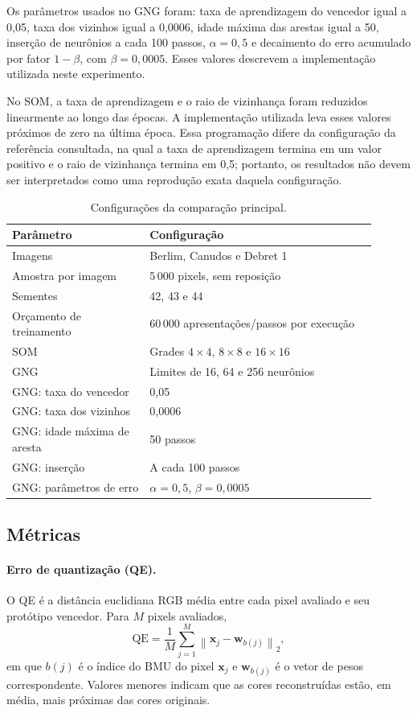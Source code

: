 \documentclass[11pt,a4paper]{article}
\begin{document}
Os parâmetros usados no GNG foram: taxa de aprendizagem do vencedor igual a
0,05, taxa dos vizinhos igual a 0,0006, idade máxima das arestas igual a 50,
inserção de neurônios a cada 100 passos, \(\alpha=0,5\) e decaimento do erro
acumulado por fator \(1-\beta\), com \(\beta=0,0005\). Esses valores descrevem
a implementação utilizada neste experimento.

No SOM, a taxa de aprendizagem e o raio de vizinhança foram reduzidos
linearmente ao longo das épocas. A implementação utilizada leva esses valores
próximos de zero na última época. Essa programação difere da configuração da
referência consultada, na qual a taxa de aprendizagem termina em um valor
positivo e o raio de vizinhança termina em 0,5; portanto, os resultados não
devem ser interpretados como uma reprodução exata daquela configuração.

\begin{table}[H]
\centering
\caption{Configurações da comparação principal.}
\label{tab:params}
\begin{tabular}{p{0.34\linewidth}p{0.56\linewidth}}
\toprule
Parâmetro & Configuração\\
\midrule
Imagens & Berlim, Canudos e Debret 1\\
Amostra por imagem & 5\,000 pixels, sem reposição\\
Sementes & 42, 43 e 44\\
Orçamento de treinamento & 60\,000 apresentações/passos por execução\\
SOM & Grades \(4\times4\), \(8\times8\) e \(16\times16\)\\
GNG & Limites de 16, 64 e 256 neurônios\\
GNG: taxa do vencedor & 0,05\\
GNG: taxa dos vizinhos & 0,0006\\
GNG: idade máxima de aresta & 50 passos\\
GNG: inserção & A cada 100 passos\\
GNG: parâmetros de erro & \(\alpha=0,5\), \(\beta=0,0005\)\\
\bottomrule
\end{tabular}
\end{table}

\subsection{Métricas}

\paragraph{Erro de quantização (QE).}
O QE é a distância euclidiana RGB média entre cada pixel avaliado e seu
protótipo vencedor. Para \(M\) pixels avaliados,
\[
\mathrm{QE}=\frac{1}{M}\sum_{j=1}^{M}
\left\|\mathbf{x}_j-\mathbf{w}_{b(j)}\right\|_2,
\]
em que \(b(j)\) é o índice do BMU do pixel \(\mathbf{x}_j\) e
\(\mathbf{w}_{b(j)}\) é o vetor de pesos correspondente. Valores menores
indicam que as cores reconstruídas estão, em média, mais próximas das cores
originais.
\end{document}
